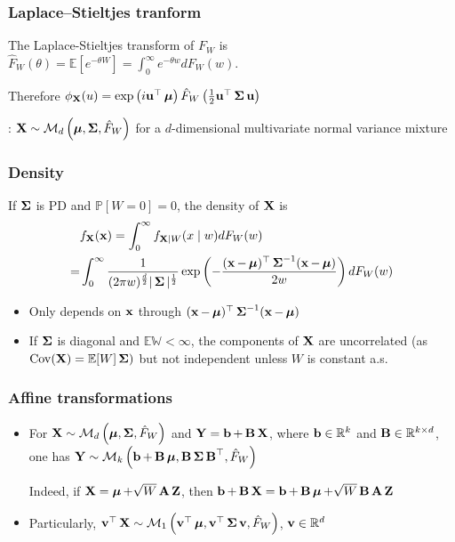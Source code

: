 \subsubsection*{Laplace–Stieltjes tranform}
The Laplace-Stieltjes transform of $F_{W}$ is $\hat{F}_{W}(\theta)=\mathbb{E}\left[e^{-\theta W}\right]=\int_{0}^{\infty} e^{-\theta w} d F_{W}(w)$.

Therefore
$
\phi_{\vect{X}}(u)=\exp \left(i \vect{u}^{\T} \mmu\right) \hat{F}_{W}\left(\frac{1}{2} \vect{u}^{\T} \mSigma \vect{u}\right)
$

: $\vect{X} \sim \M_{d}\left(\mmu, \mSigma, \hat{F}_{W}\right)$ for a $d$-dimensional multivariate normal variance mixture



\subsubsection*{Density} 
If $\mSigma$ is PD and $\mathbb{P}[W=0]=0$, the density of $\X$ is
$$
\begin{aligned}
& f_{\X}(\x)=\int_{0}^{\infty} f_{\X \mid W}(x \mid w) d F_{W}(w) \\
=& \int_{0}^{\infty} \frac{1}{(2 \pi w)^{\frac{d}{2}} |\mSigma|^{\frac{1}{2}}} \exp \left(-\frac{(\x-\mmu)^{\T} \mSigma^{-1}(\x-\mmu)}{2 w}\right) d F_{W}(w)
\end{aligned}
$$
\begin{itemize}[leftmargin=*]
    \item Only depends on $\x$ through $(\x-\mmu)^{\T} \mSigma^{-1}(\x-\mmu)$
    \item If $\mSigma$ is diagonal and $\mathbb{E W}<\infty$, the components of $\X$ are uncorrelated (as $\operatorname{Cov}(\X)=\mathbb{E}[W] \mSigma)$ but not independent unless $W$ is constant a.s.
\end{itemize}







\subsubsection*{Affine transformations}
\begin{itemize}[leftmargin=*]
    \item For $\X \sim \M_{d}\left(\mmu, \mSigma, \hat{F}_{W}\right)$ and $\Y=\b+\B \X$, where $\b \in \mathbb{R}^{k}$ and $\B \in \mathbb{R}^{k \times d}$, one has
$
\Y \sim \M_{k}\left(\b+\B \mmu, \B \mSigma \B^{\T}, \hat{F}_{W}\right)
$

Indeed, if $\X=\mmu+\sqrt{W} \A \Z$, then $\b+\B \X=\b+\B \mmu+\sqrt{W} \B \A \Z$
    \item Particularly, $\v^{\T} \X \sim \M_{1}\left(\v^{\T} \mmu, \v^{\T} \mSigma \v, \hat{F}_{W}\right)$, $\v \in \mathbb{R}^{d}$
\end{itemize}







